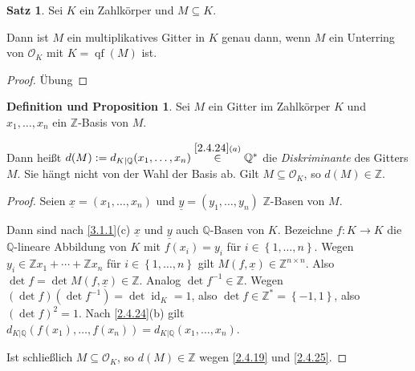 \documentclass[
twoside=semi,
fontsize=12,
DIV=12, 
cleardoublepage=current,
leqno,
headings=optiontoheadandtoc, 
toc=idx
]{scrbook}
\newcommand{\Z}{\mathbb{Z}}
\newcommand{\Q}{\mathbb{Q}}
\newcommand{\set}[1]{\left\{ #1 \right\}}
\DeclareMathOperator{\id}{id}
\DeclareMathOperator{\qf}{qf}
\theoremstyle{definition}
\newtheorem{satz}[definition]{Satz}
\newtheorem{def-prop}[definition]{Definition und Proposition}
\begin{document}
	\begin{satz}\label{3.1.5}
		Sei $K$ ein Zahlk\"orper und $M \subseteq K$. 
		
		Dann ist $M$ ein multiplikatives Gitter in $K$ genau dann, wenn $M$ ein Unterring von $\mathcal{O}_K$ mit $K = \qf(M)$ ist.
		
		\begin{proof}
			\"Ubung
		\end{proof}
	\end{satz}

	\begin{def-prop}\label{3.1.6}
		Sei $M$ ein Gitter im Zahlk\"orper $K$ und $x_1, \dots, x_n$ ein $\Z$-Basis von $M$.
		
		Dann hei\ss t $d(M) := d_{K|\Q}(x_1, \dots, x_n) \overset{\ref{2.4.24}(a)}{\in} \Q^*$ die \emph{Diskriminante} des Gitters $M$. Sie h\"angt nicht 
		von der Wahl der Basis ab. Gilt $M \subseteq \mathcal{O}_K$, so $d(M) \in \Z$.
		
		\begin{proof}
			Seien $\underline{x} = (x_1, \dots, x_n)$ und $\underline{y} = (y_1, \dots, y_n)$ $\Z$-Basen von $M$. 
			
			Dann sind nach \ref{3.1.1}(c) $\underline{x}$ und $\underline{y}$ auch $\Q$-Basen von $K$. Bezeichne $f:K\to K$ die $\Q$-lineare Abbildung von $K$ mit 
			$f(x_i) = y_i$ f\"ur $i \in \set{1,\dots, n}$. Wegen $y_i \in \Z x_1 + \cdots + \Z x_n$ f\"ur $i \in \set{1,\dots, n}$ gilt $M(f, \underline{x}) \in \Z^{n\times n}$.
			Also $\det f = \det M(f, \underline{x}) \in \Z$.
			Analog $\det f^{-1} \in \Z$. Wegen $(\det f) (\det f^{-1}) = \det \id_K = 1$, also $\det f \in \Z^* = \set{-1, 1}$, also $(\det f)^2 = 1$. Nach \ref{2.4.24}(b) gilt 
			$d_{K|\Q}(f(x_1), \dots, f(x_n)) = d_{K|\Q}(x_1, \dots, x_n)$.
			
			Ist schlie\ss lich $M \subseteq \mathcal{O}_K$, so $d(M) \in \Z$ wegen \ref{2.4.19} und \ref{2.4.25}. 
		\end{proof}
	\end{def-prop}
\end{document}
